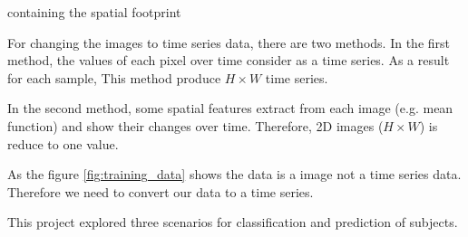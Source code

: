 containing the spatial footprint

For changing the images to time series data, there are two methods. In the first method, the values of each pixel over time consider as a time series. As a result for each sample, This method produce $H × W$ time series.

In the second method, some spatial features extract from each image (e.g. mean function) and show their changes over time. Therefore, 2D images ($H × W$) is reduce to one value.

As the figure \ref{fig:training_data} shows the data is a image not a time series data. Therefore we need to convert our data to a time series. 



This project explored three scenarios for classification and prediction of subjects.
